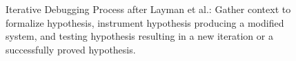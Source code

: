 \begin{figure}
  \caption{Iterative Debugging Process after Layman et al.: Gather context to formalize hypothesis, instrument hypothesis producing a modified system, and testing hypothesis resulting in a new iteration or a successfully proved hypothesis.}
  \label{fig:debugging-process}
\end{figure}
